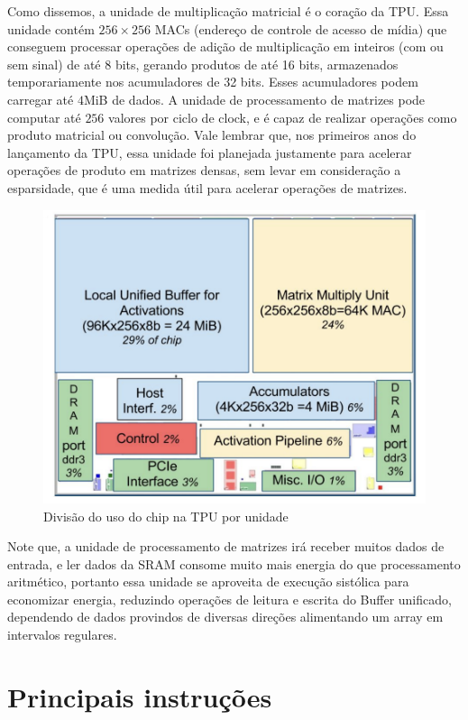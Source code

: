 \documentclass{report}
\begin{document}
Como dissemos, a unidade de multiplicação matricial é o coração da TPU. Essa unidade contém $256 \times 256$ MACs (endereço de controle de acesso de mídia) que conseguem processar operações de adição de multiplicação em inteiros (com ou sem sinal) de até 8 bits, gerando produtos de até 16 bits, armazenados temporariamente nos acumuladores de 32 bits. Esses acumuladores podem carregar até $4$MiB de dados. A unidade de processamento de matrizes pode computar até $256$ valores por ciclo de clock, e é capaz de realizar operações como produto matricial ou convolução. Vale lembrar que, nos primeiros anos do lançamento da TPU, essa unidade foi planejada justamente para acelerar operações de produto em matrizes densas, sem levar em consideração a esparsidade, que é uma medida útil para acelerar operações de matrizes.

\begin{figure}[h]
	\includegraphics[scale=0.7]{floor-plan}
	\centering
	\caption{Divisão do uso do chip na TPU por unidade}
\end{figure}

Note que, a unidade de processamento de matrizes irá receber muitos dados de entrada, e ler dados da SRAM consome muito mais energia do que processamento aritmético, portanto essa unidade se aproveita de execução sistólica para economizar energia, reduzindo operações de leitura e escrita do Buffer unificado, dependendo de dados provindos de diversas direções alimentando um array em intervalos regulares.

\section{Principais instruções}
\end{document}
